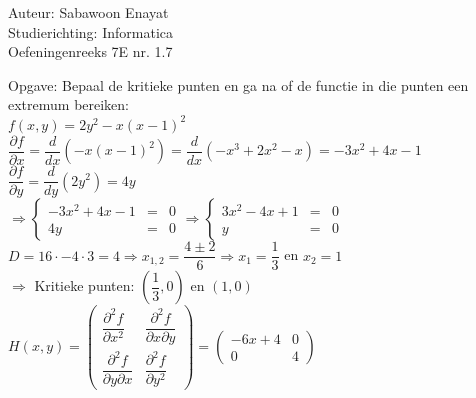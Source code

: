 \documentclass[a4paper]{article}
\begin{document}
  
\noindent \large Auteur: Sabawoon Enayat      \\
\noindent \large Studierichting: Informatica  \\
\noindent \large Oefeningenreeks 7E nr. 1.7 \\

\newcommand{\llim}{\lim\limits}

\medskip

\normalsize

Opgave: Bepaal de kritieke punten en ga na of de functie in die punten een extremum bereiken:\\

$f(x, y) = 2y^2 - x(x - 1)^2$\\

$\dfrac{\partial f}{\partial x} = \dfrac{d}{dx}\left(-x(x - 1)^2\right) = \dfrac{d}{dx}\left(-x^3 + 2x^2 - x\right) = -3x^2 + 4x - 1$\\

$\dfrac{\partial f}{\partial y} = \dfrac{d}{dy}\left(2y^2\right) = 4y$\\

$\Rightarrow \left\{
	\begin{array}{lcr}
		-3x^2 + 4x - 1 & = & 0 \\
		4y             & = & 0
	\end{array}
\right. \Rightarrow \left\{
	\begin{array}{lcr}
		3x^2 - 4x + 1 & = & 0 \\
		y             & = & 0
	\end{array}
\right.$\\

$D = 16 \cdot - 4\cdot 3 = 4 \Rightarrow x_{1,2} = \dfrac{4 \pm 2}{6} \Rightarrow x_1 = \dfrac{1}{3}$ en $x_2 = 1$\\

$\Rightarrow$ Kritieke punten: $\left(\dfrac{1}{3}, 0\right)$ en $(1, 0)$\\

$H(x,y) = \left(
	\begin{array}{cc}
		\dfrac{\partial^2 f}{\partial x^2}         & \dfrac{\partial^2 f}{\partial x\partial y} \\
		\dfrac{\partial^2 f}{\partial y\partial x} & \dfrac{\partial^2 f}{\partial y^2}
	\end{array}
\right) = \left(
	\begin{array}{cc}
		-6x + 4 & 0 \\
		0       & 4
	\end{array}
\right)$\\
\end{document}
